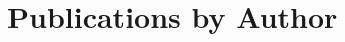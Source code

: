 \documentclass[12pt]{report}
\begin{document}






\appendix
\chapter{Publications by Author}




\end{document}
